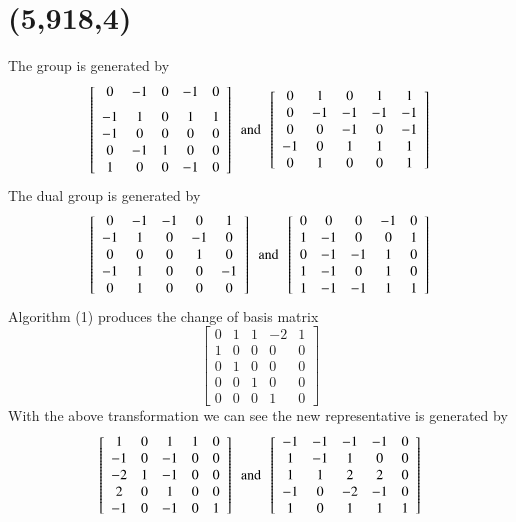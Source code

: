  \section{(5,918,4)}
The group is generated by 
$$
  \left[ \begin {array}{ccccc} 0&-1&0&-1&0\\ \noalign{\medskip}-1&1&0&1
&1\\ -1&0&0&0&0\\ 0&-1&1&0&0
\\ 1&0&0&-1&0\end {array} \right] 
\tand
 \left[ \begin {array}{ccccc} 0&1&0&1&1\\ 0&-1&-1&-1
&-1\\ 0&0&-1&0&-1\\ -1&0&1&1&1
\\ 0&1&0&0&1\end {array} \right] 
$$
The dual group is generated by 
$$
\left[ \begin {array}{ccccc} 0&-1&-1&0&1\\ -1&1&0&-
1&0\\ 0&0&0&1&0\\ -1&1&0&0&-1
\\ 0&1&0&0&0\end {array} \right] 
\,\,\, \text{and} \,\,\,
 \left[ \begin {array}{ccccc} 0&0&0&-1&0\\ 1&-1&0&0&
1\\ 0&-1&-1&1&0\\ 1&-1&0&1&0
\\ 1&-1&-1&1&1\end {array} \right]
$$
Algorithm (1) produces the change of basis matrix 
$$
  \left[ \begin {array}{ccccc} 0&1&1&-2&1\\ 1&0&0&0&0
\\ 0&1&0&0&0\\ 0&0&1&0&0
\\ 0&0&0&1&0\end {array} \right]
$$
With the above transformation we can see the new representative is generated by 
$$
  \left[ \begin {array}{ccccc} 1&0&1&1&0\\ -1&0&-1&0&0
\\ -2&1&-1&0&0\\ 2&0&1&0&0
\\ -1&0&-1&0&1\end {array} \right] 
\,\,\, \text{and} \,\,\,
 \left[ \begin {array}{ccccc} -1&-1&-1&-1&0\\ 1&-1&1
&0&0\\ 1&1&2&2&0\\ -1&0&-2&-1&0
\\ 1&0&1&1&1\end {array} \right] 
$$
